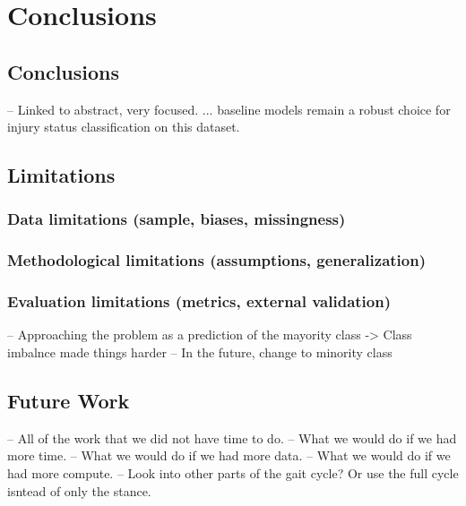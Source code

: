 \chapter{Conclusions}\label{chap:conclusions}

\section{Conclusions}\label{sec:conc-conclusions}
-- Linked to abstract, very focused.
... baseline models remain a robust choice for injury status classification on this dataset.

\section{Limitations}\label{sec:conc-limitations}

\subsection{Data limitations (sample, biases, missingness)}\label{sec:limitations-data}

\subsection{Methodological limitations (assumptions, generalization)}\label{sec:limitations-methods}

\subsection{Evaluation limitations (metrics, external validation)}\label{sec:limitations-evaluation}
-- Approaching the problem as a prediction of the mayority class -> Class imbalnce made things harder
    -- In the future, change to minority class

\section{Future Work}\label{sec:conc-future-work}
-- All of the work that we did not have time to do.
-- What we would do if we had more time.
-- What we would do if we had more data.
-- What we would do if we had more compute.
-- Look into other parts of the gait cycle? Or use the full cycle isntead of only the stance.